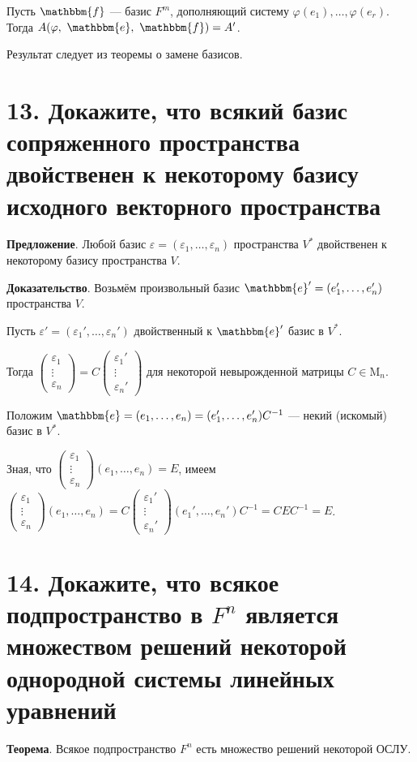 \documentclass[a4paper, 12pt]{article}
\newcommand{\me}{\mathbbm{e}}
\newcommand{\mf}{\mathbbm{f}}
\begin{document}
Пусть $\mf$ --- базис $F^m$, дополняющий систему $\varphi(e_1), \ldots, \varphi(e_r)$. Тогда $A(\varphi,\ \me,\ \mf) = A'$.

Результат следует из теоремы о замене базисов.

\section*{13. Докажите, что всякий базис сопряженного пространства двойственен к некоторому базису исходного векторного пространства}
\textbf{Предложение}. Любой базис $\varepsilon = (\varepsilon_1, \ldots, \varepsilon_n)$ пространства $V^*$ двойственен к некоторому базису пространства $V$.

\textbf{Доказательство}. Возьмём произвольный базис $\me' = (e_1', \ldots, e_n')$ пространства $V$.

Пусть $\varepsilon' = (\varepsilon_1', \ldots, \varepsilon_n')$ двойственный к $\me'$ базис в $V^*$.

Тогда $\begin{pmatrix}\varepsilon_1 \\ \vdots \\ \varepsilon_n \end{pmatrix} = C \begin{pmatrix}\varepsilon_1' \\ \vdots \\ \varepsilon_n' \end{pmatrix}$ для некоторой невырожденной матрицы $C \in \text{M}_n$.

Положим $\me = (e_1, \ldots, e_n) = (e_1', \ldots, e_n') C^{-1}$ --- некий (искомый) базис в $V^*$.

Зная, что $\begin{pmatrix}\varepsilon_1 \\ \vdots \\ \varepsilon_n \end{pmatrix}(e_1, \ldots, e_n) = E$, имеем $\begin{pmatrix}\varepsilon_1 \\ \vdots \\ \varepsilon_n \end{pmatrix} (e_1, \ldots, e_n) = C\begin{pmatrix}\varepsilon_1' \\ \vdots \\ \varepsilon_n' \end{pmatrix}(e_1', \ldots, e_n')C^{-1} = CEC^{-1} = E$.

\section*{14. Докажите, что всякое подпространство в $F^n$ является множеством решений некоторой однородной системы линейных уравнений}
\textbf{Теорема}. Всякое подпространство $F^n$ есть множество решений некоторой ОСЛУ.
\end{document}
